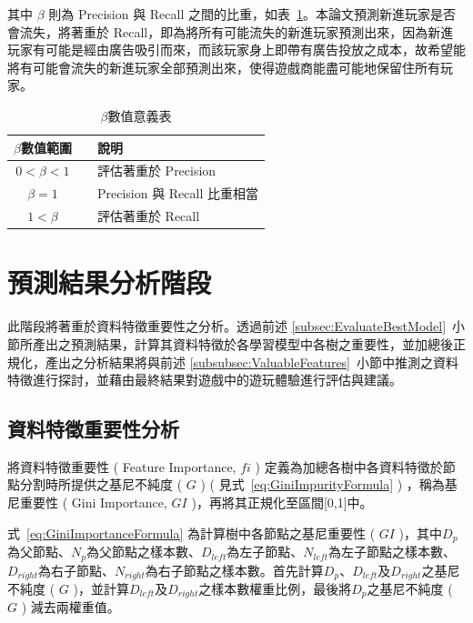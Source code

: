 其中 $\beta$ 則為 Precision 與 Recall 之間的比重，如表~\ref{tab:beta}。本論文預測新進玩家是否會流失，將著重於 Recall，即為將所有可能流失的新進玩家預測出來，因為新進玩家有可能是經由廣告吸引而來，而該玩家身上即帶有廣告投放之成本，故希望能將有可能會流失的新進玩家全部預測出來，使得遊戲商能盡可能地保留住所有玩家。

\begin{table}[!htb]
	\centering
	\begin{tabular}{ccl}
		\hline \hline
		$\beta$數值範圍 && 說明 \\
    \hline \hline
    $0 < \beta < 1$ && 評估著重於 Precision \\
    \hline
    $\beta = 1$ && Precision 與 Recall 比重相當 \\
    \hline
    $1 < \beta$ && 評估著重於 Recall \\
    \hline \hline
		\end{tabular}
	\caption[$\beta$數值意義表]{$\beta$數值意義表}
	\label{tab:beta}
\end{table}

\section{預測結果分析階段}
\label{sec:PredictionResultAnalysis}

此階段將著重於資料特徵重要性之分析。透過前述 \ref{subsec:EvaluateBestModel}~小節所產出之預測結果，計算其資料特徵於各學習模型中各樹之重要性，並加總後正規化，產出之分析結果將與前述 \ref{subsubsec:ValuableFeatures}~小節中推測之資料特徵進行探討，並藉由最終結果對遊戲中的遊玩體驗進行評估與建議。

\subsection{資料特徵重要性分析}
\label{subsec:FeatureImportanceAnalysis}

將資料特徵重要性 ( Feature Importance, $fi$ ) 定義為加總各樹中各資料特徵於節點分割時所提供之基尼不純度 ( $G$ ) ( 見式~\ref{eq:GiniImpurityFormula} ) ，稱為基尼重要性 ( Gini Importance, $GI$ )，再將其正規化至區間[0,1]中。

式~\ref{eq:GiniImportanceFormula} 為計算樹中各節點之基尼重要性 ( $GI$ )，其中$D_p$為父節點、$N_p$為父節點之樣本數、$D_{left}$為左子節點、$N_{left}$為左子節點之樣本數、$D_{right}$為右子節點、$N_{right}$為右子節點之樣本數。首先計算$D_p$、$D_{left}$及$D_{right}$之基尼不純度 ( $G$ )，並計算$D_{left}$及$D_{right}$之樣本數權重比例，最後將$D_p$之基尼不純度 ( $G$ ) 減去兩權重值。

